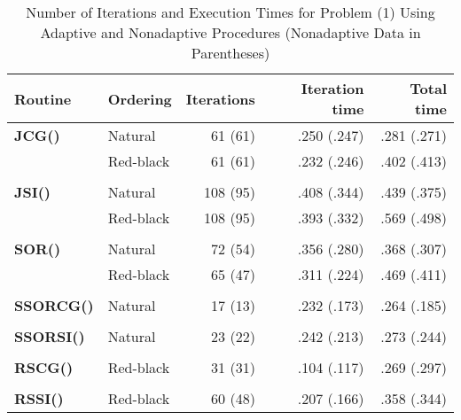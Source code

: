 \begin{table}
\begin{center}
\begin{tabular}{llrrr} \hline 
 Routine & Ordering & Iterations & Iteration time & Total time \\ \hline
 {\bf JCG()}    & Natural   &  61 (61) & .250 (.247) & .281 (.271) \\
                & Red-black &  61 (61) & .232 (.246) & .402 (.413) \\
                &           &          &             &             \\ 
 {\bf JSI()}    & Natural   & 108 (95) & .408 (.344) & .439 (.375) \\
                & Red-black & 108 (95) & .393 (.332) & .569 (.498) \\
                &           &          &             &             \\ 
 {\bf SOR()}    & Natural   &  72 (54) & .356 (.280) & .368 (.307) \\
                & Red-black &  65 (47) & .311 (.224) & .469 (.411) \\
                &           &          &             &             \\ 
 {\bf SSORCG()} & Natural   &  17 (13) & .232 (.173) & .264 (.185) \\
                &           &          &             &             \\ 
 {\bf SSORSI()} & Natural   &  23 (22) & .242 (.213) & .273 (.244) \\
                &           &          &             &             \\ 
 {\bf RSCG()}   & Red-black &  31 (31) & .104 (.117) & .269 (.297) \\
                &           &          &             &             \\ 
 {\bf RSSI()}   & Red-black &  60 (48) & .207 (.166) & .358 (.344) \\
              \hline
\end{tabular}
\caption{Number of Iterations and Execution Times for
         Problem (1) Using Adaptive and Nonadaptive
         Procedures (Nonadaptive Data in Parentheses)}
\label{prob1}
\end{center}
\end{table}
 

